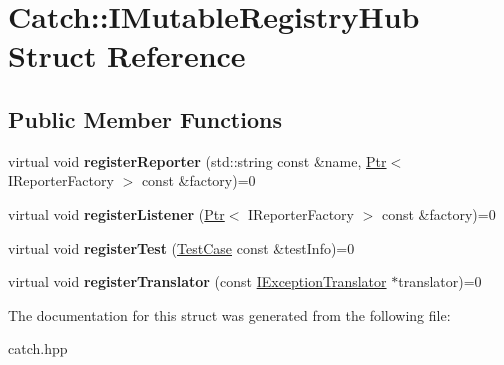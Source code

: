 \hypertarget{structCatch_1_1IMutableRegistryHub}{}\section{Catch\+:\+:I\+Mutable\+Registry\+Hub Struct Reference}
\label{structCatch_1_1IMutableRegistryHub}
\subsection*{Public Member Functions}
\begin{DoxyCompactItemize}
\item 
virtual void {\bfseries register\+Reporter} (std\+::string const \&name, \hyperlink{classCatch_1_1Ptr}{Ptr}$<$ I\+Reporter\+Factory $>$ const \&factory)=0\hypertarget{structCatch_1_1IMutableRegistryHub_aab72d0aa1fa14627f1a6a4c893ae0a12}{}\label{structCatch_1_1IMutableRegistryHub_aab72d0aa1fa14627f1a6a4c893ae0a12}

\item 
virtual void {\bfseries register\+Listener} (\hyperlink{classCatch_1_1Ptr}{Ptr}$<$ I\+Reporter\+Factory $>$ const \&factory)=0\hypertarget{structCatch_1_1IMutableRegistryHub_ae06fcb90ba3f2b389d450cd81e229276}{}\label{structCatch_1_1IMutableRegistryHub_ae06fcb90ba3f2b389d450cd81e229276}

\item 
virtual void {\bfseries register\+Test} (\hyperlink{classCatch_1_1TestCase}{Test\+Case} const \&test\+Info)=0\hypertarget{structCatch_1_1IMutableRegistryHub_a11b85c6744d88c9f83fe16ad4a8dd451}{}\label{structCatch_1_1IMutableRegistryHub_a11b85c6744d88c9f83fe16ad4a8dd451}

\item 
virtual void {\bfseries register\+Translator} (const \hyperlink{structCatch_1_1IExceptionTranslator}{I\+Exception\+Translator} $\ast$translator)=0\hypertarget{structCatch_1_1IMutableRegistryHub_ae6825365102693cf7707db022a2c2b49}{}\label{structCatch_1_1IMutableRegistryHub_ae6825365102693cf7707db022a2c2b49}

\end{DoxyCompactItemize}


The documentation for this struct was generated from the following file\+:\begin{DoxyCompactItemize}
\item 
catch.\+hpp\end{DoxyCompactItemize}
